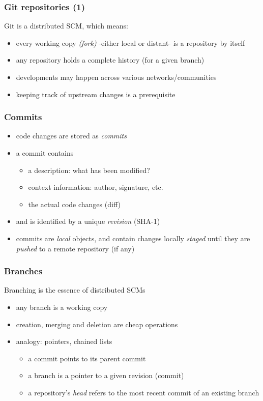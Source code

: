 \documentclass{beamer}
\begin{document}
\begin{frame}
  \frametitle{Git repositories (1)}

  Git is a distributed SCM, which means:
  \pause
  \begin{itemize}[<+->]
    \item every working copy \textit{(fork)} -either local or distant-
      is a repository by itself
    \item any repository holds a complete history (for a given branch)
    \item developments may happen across various networks/communities
    \item keeping track of upstream changes is a prerequisite
  \end{itemize}
\end{frame}

\begin{frame}
  \frametitle{Commits}

  \begin{itemize}[<+->]
    \item code changes are stored as \textit{commits}
    \item a commit contains
      \begin{itemize}
        \item a description: what has been modified?
        \item context information: author, signature, etc.
        \item the actual code changes (diff)
      \end{itemize}
    \item and is identified by a unique \textit{revision} (SHA-1)
    \item commits are \textit{local} objects, and contain changes locally
      \textit{staged} until they are \textit{pushed} to a remote repository
      (if any)
  \end{itemize}
\end{frame}

\begin{frame}
  \frametitle{Branches}

  Branching is the essence of distributed SCMs
  \pause
  \begin{itemize}[<+->]
    \item any branch is a working copy
    \item creation, merging and deletion are cheap operations
    \item analogy: pointers, chained lists
      \begin{itemize}
        \item a commit points to its parent commit
        \item a branch is a pointer to a given revision (commit)
        \item a repository's \textit{head} refers to the most recent
          commit of an existing branch
      \end{itemize}
  \end{itemize}
\end{frame}
\end{document}
